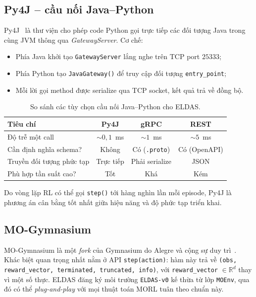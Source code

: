 \subsection{Py4J -- cầu nối Java--Python}
Py4J~\cite{py4j2024} là thư viện cho phép code Python gọi trực tiếp các đối
tượng Java trong cùng JVM thông qua \textit{GatewayServer}. Cơ chế:
\begin{itemize}
  \item Phía Java khởi tạo \texttt{GatewayServer} lắng nghe trên TCP port
        $25333$;
  \item Phía Python tạo \texttt{JavaGateway()} để truy cập đối tượng
        \texttt{entry\_point};
  \item Mỗi lời gọi method được serialize qua TCP socket, kết quả trả về
        đồng bộ.
\end{itemize}

\begin{table}[H]
  \centering
  \caption{So sánh các tùy chọn cầu nối Java--Python cho ELDAS.}
  \label{tab:bridge-comparison}
  \small
  \begin{tabular}{lccc}
    \toprule
    \textbf{Tiêu chí} & \textbf{Py4J} & \textbf{gRPC} & \textbf{REST} \\
    \midrule
    Độ trễ một call    & $\sim 0{,}1$~ms & $\sim 1$~ms     & $\sim 5$~ms     \\
    Cần định nghĩa schema? & Không   & Có (\texttt{.proto}) & Có (OpenAPI) \\
    Truyền đối tượng phức tạp & Trực tiếp & Phải serialize & JSON \\
    Phù hợp tần suất cao? & Tốt   & Khá          & Kém       \\
    \bottomrule
  \end{tabular}
\end{table}

Do vòng lặp RL có thể gọi \texttt{step()} tới hàng nghìn lần mỗi
episode, Py4J là phương án cân bằng tốt nhất giữa hiệu năng và độ phức
tạp triển khai.

\subsection{MO-Gymnasium}
MO-Gymnasium là một \textit{fork} của Gymnasium do Alegre và cộng sự
duy trì~\cite{alegre2022mogym}. Khác biệt quan trọng nhất nằm ở API
\texttt{step(action)}: hàm này trả về \texttt{(obs, reward\_vector,
terminated, truncated, info)}, với \texttt{reward\_vector} $\in
\mathbb{R}^d$ thay vì một số thực. ELDAS đăng ký môi trường
\texttt{ELDAS-v0} kế thừa từ lớp \texttt{MOEnv}, qua đó có thể
\textit{plug-and-play} với mọi thuật toán MORL tuân theo chuẩn này.

